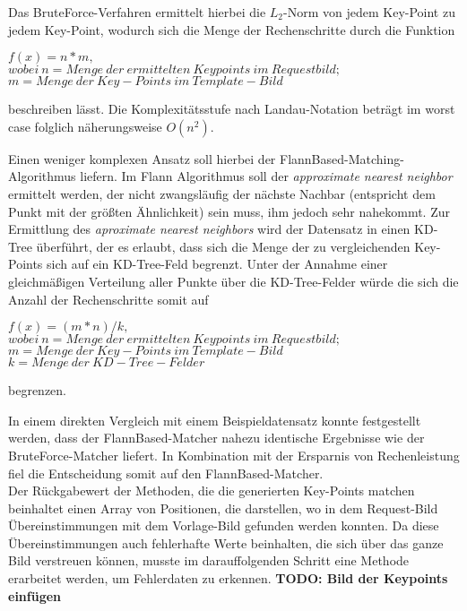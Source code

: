 \documentclass[
    type=Projektarbeit,
    status=draft, %
    language=german, %
    bibengine=bibtex,
]{unibwm-inf-thesis}
\newcommand{\todo}[1]{\textbf{TODO: #1}}
\begin{document}
    Das BruteForce-Verfahren ermittelt hierbei die $L_{2}$-Norm von jedem Key-Point zu jedem Key-Point, wodurch sich die Menge der Rechenschritte durch die Funktion
\begin{center}
    $f(x) = n * m,$ \\
    $wobei~n= Menge~der~ermittelten~Keypoints~im~Requestbild;$\\
    $m = Menge~der~Key-Points~im~Template-Bild$\\
\end{center}
    beschreiben lässt.
    Die Komplexitätsstufe nach Landau-Notation beträgt im worst case folglich näherungsweise $O(n^{2})$.

    Einen weniger komplexen Ansatz soll hierbei der FlannBased-Matching-Algorithmus liefern.
    Im Flann Algorithmus soll der \textit{approximate nearest neighbor} ermittelt werden, der nicht zwangsläufig der nächste Nachbar (entspricht dem Punkt mit der größten Ähnlichkeit) sein muss,
    ihm jedoch sehr nahekommt.
    Zur Ermittlung des \textit{aproximate nearest neighbors} wird der Datensatz in einen KD-Tree überführt, der es erlaubt, dass sich die Menge der zu vergleichenden Key-Points sich auf ein KD-Tree-Feld begrenzt.
    Unter der Annahme einer gleichmäßigen Verteilung aller Punkte über die KD-Tree-Felder würde die sich die Anzahl der Rechenschritte somit auf
    \begin{center}
        $f(x) = (m*n) / k, $ \\
        $wobei~n= Menge~der~ermittelten~Keypoints~im~Requestbild;$\\
        $m = Menge~der~Key-Points~im~Template-Bild$\\
        $k = Menge~der~KD-Tree-Felder$\\
    \end{center}
    begrenzen.

    In einem direkten Vergleich mit einem Beispieldatensatz konnte festgestellt werden, dass der FlannBased-Matcher nahezu identische Ergebnisse wie der BruteForce-Matcher liefert.
    In Kombination mit der Ersparnis von Rechenleistung fiel die Entscheidung somit auf den FlannBased-Matcher.\\



    Der Rückgabewert der Methoden, die die generierten Key-Points matchen beinhaltet einen Array von Positionen, die darstellen, wo in dem Request-Bild Übereinstimmungen mit dem Vorlage-Bild gefunden werden konnten.
    Da diese Übereinstimmungen auch fehlerhafte Werte beinhalten, die sich über das ganze Bild verstreuen können, musste im darauffolgenden Schritt eine Methode erarbeitet werden, um Fehlerdaten zu erkennen.
    \todo{Bild der Keypoints einfügen}
\end{document}
